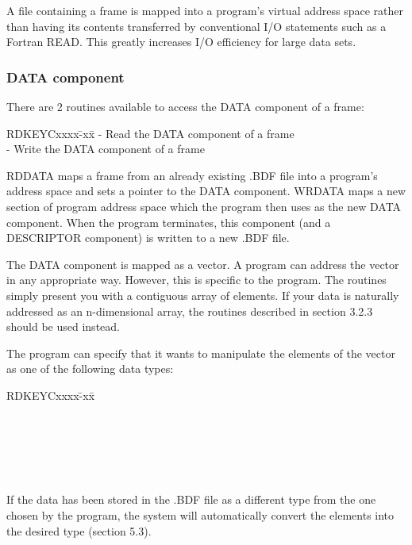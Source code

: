 A file containing a frame is mapped into a program's virtual address space
rather than having its contents transferred by conventional I/O statements
such as a Fortran READ.
This greatly increases I/O efficiency for large data sets.
\subsubsection {DATA component}
There are 2 routines available to access the DATA component of a frame:
\begin{tabbing}
\hspace{40mm}RDKEYCxxxx\=-xx\=\kill
\hspace{40mm}{\bf RDDATA} \>- \>Read the DATA component of a frame\\
\hspace{40mm}{\bf WRDATA} \>- \>Write the DATA component of a frame
\end{tabbing}
RDDATA maps a frame from an already existing .BDF file into a program's
address space and sets a pointer to the DATA component.
WRDATA maps a new section of program address space which the program then
uses as the new DATA component.
When the program terminates, this component (and a DESCRIPTOR component)
is written to a new .BDF file.

The DATA component is mapped as a vector.
A program can address the vector in any appropriate way.
However, this is specific to the program.
The routines simply present you with a contiguous array of elements.
If your data is naturally addressed as an n-dimensional array, the routines
described in section 3.2.3 should be used instead.

The program can specify that it wants to manipulate the elements of the vector
as one of the following data types:
\begin{tabbing}
\hspace{40mm}RDKEYCxxxx\=-xx\=\kill
\hspace{40mm}{\bf Signed Byte}\\
\hspace{40mm}{\bf Signed Word}\\
\hspace{40mm}{\bf Signed Longword}\\
\hspace{40mm}{\bf Real}\\
\hspace{40mm}{\bf Double Precision}\\
\hspace{40mm}{\bf Unsigned Byte}\\
\hspace{40mm}{\bf Unsigned Word}
\end{tabbing}
If the data has been stored in the .BDF file as a different type from
the one chosen by the program, the system will automatically convert the
elements into the desired type (section 5.3).
